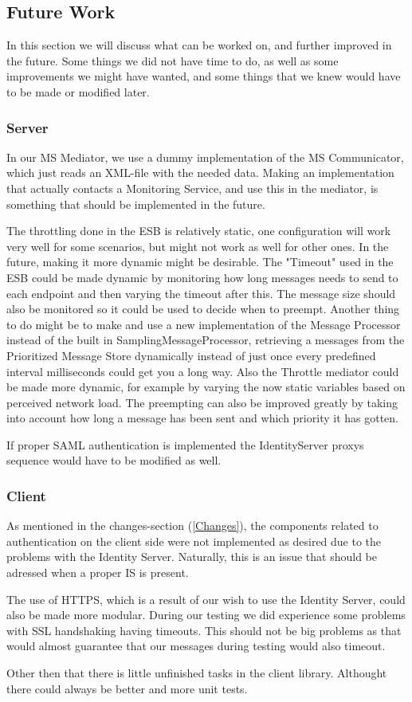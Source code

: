 \subsection{Future Work}\label{Future Work}
    In this section we will discuss what can be worked on, and further improved in the future. Some things we did not have time to do, as well as some improvements we might have wanted, and some things that we knew would have to be made or modified later.

    \subsubsection{Server}\label{Future:Server}
        In our MS Mediator, we use a dummy implementation of the MS Communicator, which just reads an XML-file with the needed data. Making an implementation that actually contacts a Monitoring Service, and use this in the mediator, is something that should be implemented in the future.

        The throttling done in the ESB is relatively static, one configuration will work very well for some scenarios, but might not work as well for other ones. In the future, making it more dynamic might be desirable. The "Timeout" used in the ESB could be made dynamic by monitoring how long messages needs to send to each endpoint and then varying the timeout after this. The message size should also be monitored so it could be used to decide when to preempt. Another thing to do might be to make and use a new implementation of the Message Processor instead of the built in SamplingMessageProcessor, retrieving a messages from the Prioritized Message Store dynamically instead of just once every predefined interval milliseconds could get you a long way. Also the Throttle mediator could be made more dynamic, for example by varying the now static variables based on perceived network load. The preempting can also be improved greatly by taking into account how long a message has been sent and which priority it has gotten.

        If proper SAML authentication is implemented the IdentityServer proxys sequence would have to be modified as well.

	\subsubsection{Client}\label{Future:Client}
		As mentioned in the changes-section (\ref{Changes}), the components related to authentication on the client side were not implemented as desired due to the problems with the Identity Server. Naturally, this is an issue that should be adressed when a proper IS is present.

		The use of HTTPS, which is a result of our wish to use the Identity Server, could also be made more modular. During our testing we did experience some problems with SSL handshaking having timeouts. This should not be big problems as that would almost guarantee that our messages during testing would also timeout.
		
    	Other then that there is little unfinished tasks in the client library. Althought there could always be better and more unit tests. 

